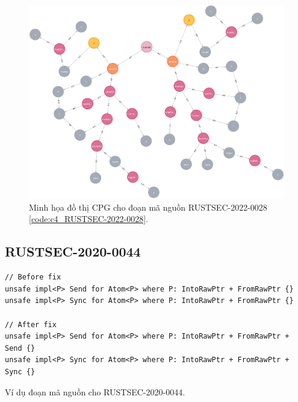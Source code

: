 


\begin{figure}[H]
    \includegraphics[width=1\columnwidth]{figures/c4/c4_RUSTSEC-2022-0028.png}
    \centering
    \caption{Minh họa đồ thị CPG cho đoạn mã nguồn RUSTSEC-2022-0028 \ref{code:c4_RUSTSEC-2022-0028}.}
    \label{img:c4_RUSTSEC-2022-0028}
\end{figure}


\subsection{RUSTSEC-2020-0044}


\begin{listing}[H]
\begin{verbatim}
// Before fix
unsafe impl<P> Send for Atom<P> where P: IntoRawPtr + FromRawPtr {}
unsafe impl<P> Sync for Atom<P> where P: IntoRawPtr + FromRawPtr {}

// After fix
unsafe impl<P> Send for Atom<P> where P: IntoRawPtr + FromRawPtr + Send {}
unsafe impl<P> Sync for Atom<P> where P: IntoRawPtr + FromRawPtr + Sync {}
\end{verbatim}
\caption{Ví dụ đoạn mã nguồn cho RUSTSEC-2020-0044.}
\label{code:c4_RUSTSEC-2020-0044}
\end{listing}

